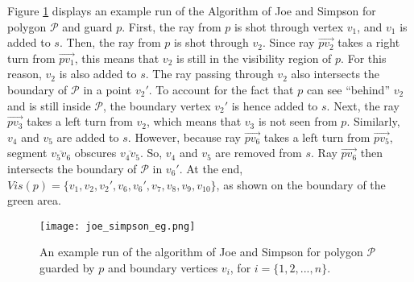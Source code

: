 Figure \ref{fig:joe} displays an example run of the Algorithm of Joe and Simpson \cite{joe1987corrections} for polygon $\mathcal P$ and guard $p$. First, the ray from $p$ is shot through vertex $v_1$, and $v_1$ is added to $s$. Then, the ray from $p$ is shot through $v_2$. Since ray $\vec{pv_2}$ takes a right turn from $\vec{pv_1}$, this means that $v_2$ is still in the visibility region of $p$. For this reason, $v_2$ is also added to $s$. The ray passing through $v_2$ also intersects the boundary of $\mathcal P$ in a point $v_2'$. To account for the fact that $p$ can see ``behind'' $v_2$ and is still inside $\mathcal P$, the boundary vertex $v_2'$ is hence added to $s$. Next, the ray $\vec{pv_3}$ takes a left turn from $v_2$, which means that $v_3$ is not seen from $p$. Similarly, $v_4$ and $v_5$ are added to $s$. However, because ray $\vec{pv_6}$ takes a left turn from $\vec{pv_5}$, segment $\overline{v_5v_6}$ obscures $\overline{v_4v_5}$. So, $v_4$ and $v_5$ are removed from $s$. Ray $\vec{pv_6}$ then intersects the boundary of $\mathcal P$ in $v_6'$. At the end, $Vis(p) = \{v_1, v_2, v_2', v_6, v_6', v_7, v_8, v_9, v_{10}\}$, as shown on the boundary of the green area. 

\begin{figure}[h!]
	\centering
	\texttt{[image: joe\_simpson\_eg.png]}
	\caption{An example run of the algorithm of Joe and Simpson \cite{joe1987corrections} for polygon $\mathcal P$ guarded by $p$ and boundary vertices $v_i$, for $i = \{1, 2, ..., n\}$.}
	\label{fig:joe}
\end{figure}




